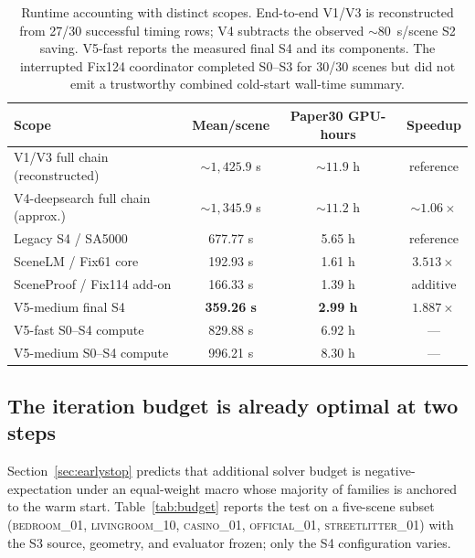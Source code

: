 \documentclass[10pt,twocolumn]{article}
\begin{document}
\begin{table}[t]
\centering
\caption{Runtime accounting with distinct scopes.  End-to-end V1/V3 is
reconstructed from 27/30 successful timing rows; V4 subtracts the observed
${\sim}80$~s/scene S2 saving.  V5-fast reports the measured final S4 and its
components.  The interrupted Fix124 coordinator completed S0--S3 for 30/30
scenes but did not emit a trustworthy combined cold-start wall-time summary.}
\label{tab:runtime}
\small
\begin{tabular}{lccc}
\toprule
Scope & Mean/scene & Paper30 GPU-hours & Speedup \\
\midrule
V1/V3 full chain (reconstructed) & ${\sim}1{,}425.9$ s & ${\sim}11.9$ h & reference \\
V4-deepsearch full chain (approx.) & ${\sim}1{,}345.9$ s & ${\sim}11.2$ h & ${\sim}1.06\times$ \\
Legacy S4 / SA5000 & 677.77 s & 5.65 h & reference \\
SceneLM / Fix61 core & 192.93 s & 1.61 h & $3.513\times$ \\
SceneProof / Fix114 add-on & 166.33 s & 1.39 h & additive \\
V5-medium final S4 & \textbf{359.26 s} & \textbf{2.99 h} & \textbf{$1.887\times$} \\
V5-fast S0--S4 compute & 829.88 s & 6.92 h & --- \\
V5-medium S0--S4 compute & 996.21 s & 8.30 h & --- \\
\bottomrule
\end{tabular}
\end{table}

\subsection{The iteration budget is already optimal at two steps}
\label{sec:budget}

Section~\ref{sec:earlystop} predicts that additional solver budget is
negative-expectation under an equal-weight macro whose majority of families is
anchored to the warm start.  Table~\ref{tab:budget} reports the test on a
five-scene subset (\textsc{bedroom\_01}, \textsc{livingroom\_10},
\textsc{casino\_01}, \textsc{official\_01}, \textsc{streetlitter\_01}) with the
S3 source, geometry, and evaluator frozen; only the S4 configuration varies.
\end{document}
